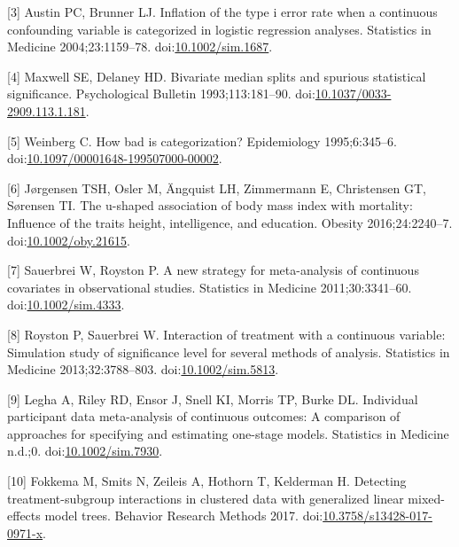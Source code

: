 \documentclass[14pt,]{article}
\begin{document}
\hypertarget{ref-Austin_2004}{}
{[}3{]} Austin PC, Brunner LJ. Inflation of the type i error rate when a
continuous confounding variable is categorized in logistic regression
analyses. Statistics in Medicine 2004;23:1159--78.
doi:\href{https://doi.org/10.1002/sim.1687}{10.1002/sim.1687}.

\hypertarget{ref-Maxwell_1993}{}
{[}4{]} Maxwell SE, Delaney HD. Bivariate median splits and spurious
statistical significance. Psychological Bulletin 1993;113:181--90.
doi:\href{https://doi.org/10.1037/0033-2909.113.1.181}{10.1037/0033-2909.113.1.181}.

\hypertarget{ref-Weinberg_1995}{}
{[}5{]} Weinberg C. How bad is categorization? Epidemiology
1995;6:345--6.
doi:\href{https://doi.org/10.1097/00001648-199507000-00002}{10.1097/00001648-199507000-00002}.

\hypertarget{ref-J_rgensen_2016}{}
{[}6{]} Jørgensen TSH, Osler M, Ängquist LH, Zimmermann E, Christensen
GT, Sørensen TI. The u-shaped association of body mass index with
mortality: Influence of the traits height, intelligence, and education.
Obesity 2016;24:2240--7.
doi:\href{https://doi.org/10.1002/oby.21615}{10.1002/oby.21615}.

\hypertarget{ref-Sauerbrei_2011}{}
{[}7{]} Sauerbrei W, Royston P. A new strategy for meta-analysis of
continuous covariates in observational studies. Statistics in Medicine
2011;30:3341--60.
doi:\href{https://doi.org/10.1002/sim.4333}{10.1002/sim.4333}.

\hypertarget{ref-royston_interaction_2013}{}
{[}8{]} Royston P, Sauerbrei W. Interaction of treatment with a
continuous variable: Simulation study of significance level for several
methods of analysis. Statistics in Medicine 2013;32:3788--803.
doi:\href{https://doi.org/10.1002/sim.5813}{10.1002/sim.5813}.

\hypertarget{ref-Legha_2018}{}
{[}9{]} Legha A, Riley RD, Ensor J, Snell KI, Morris TP, Burke DL.
Individual participant data meta-analysis of continuous outcomes: A
comparison of approaches for specifying and estimating one-stage models.
Statistics in Medicine n.d.;0.
doi:\href{https://doi.org/10.1002/sim.7930}{10.1002/sim.7930}.

\hypertarget{ref-Fokkema_2017}{}
{[}10{]} Fokkema M, Smits N, Zeileis A, Hothorn T, Kelderman H.
Detecting treatment-subgroup interactions in clustered data with
generalized linear mixed-effects model trees. Behavior Research Methods
2017.
doi:\href{https://doi.org/10.3758/s13428-017-0971-x}{10.3758/s13428-017-0971-x}.
\end{document}
